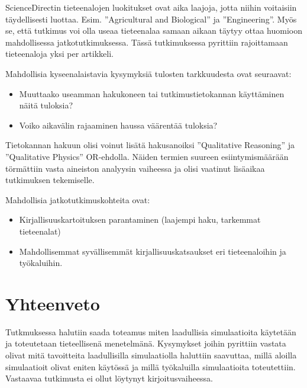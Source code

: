 \documentclass[utf8]{gradu3}
\begin{document}

ScienceDirectin tieteenalojen luokitukset ovat aika laajoja, jotta niihin voitaisiin täydellisesti luottaa. Esim. ''Agricultural and Biological'' ja ''Engineering''. Myös se, että tutkimus voi olla useaa tieteenalaa samaan aikaan täytyy ottaa huomioon mahdollisessa jatkotutkimuksessa. 
Tässä tutkimuksessa pyrittiin rajoittamaan tieteenaloja yksi per artikkeli.

Mahdollisia kyseenalaistavia kysymyksiä tulosten tarkkuudesta ovat seuraavat:
\begin{itemize}
    \item Muuttaako useamman hakukoneen tai tutkimustietokannan käyttäminen näitä tuloksia? 
    \item Voiko aikavälin rajaaminen haussa väärentää tuloksia?
\end{itemize}

Tietokannan hakuun olisi voinut lisätä hakusanoiksi 
''Qualitative Reasoning'' ja ''Qualitative Physics'' OR-ehdolla. 
Näiden termien suureen esiintymismäärään törmättiin vasta aineiston 
analyysin vaiheessa ja olisi vaatinut lisäaikaa tutkimuksen tekemiselle.

Mahdollisia jatkotutkimuskohteita ovat: 
\begin{itemize}
    \item Kirjallisuuskartoituksen parantaminen  (laajempi haku, tarkemmat tieteenalat)
    \item Mahdollisemmat syvällisemmät kirjallisuuskatsaukset eri tieteenaloihin ja työkaluihin.
\end{itemize}

\chapter{Yhteenveto}
Tutkmuksessa halutiin saada toteamus miten laadullisia simulaatioita käytetään
ja toteutetaan tieteellisenä menetelmänä. Kysymykset joihin pyrittiin vastata 
olivat mitä tavoitteita laadullisilla simulaatiolla haluttiin saavuttaa, 
millä aloilla simulaatioit olivat eniten käytössä ja 
millä työkaluilla simulaatioita toteutettiin. Vastaavaa tutkimusta ei ollut 
löytynyt kirjoitusvaiheessa.
\end{document}
